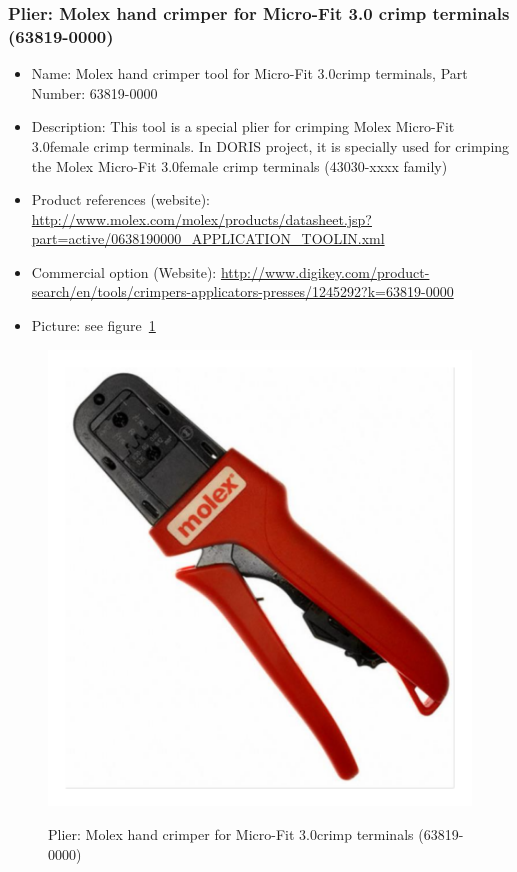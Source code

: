 \subsubsection{Plier: Molex hand crimper for Micro-Fit 3.0 \texttrademark crimp terminals (63819-0000)} \label{DEVICE:TOOLCRIMPERmicro}
\begin{itemize}
\item Name: Molex hand crimper tool for Micro-Fit 3.0\texttrademark crimp terminals, Part Number: 63819-0000
  \item Description: This tool is a special plier for crimping Molex Micro-Fit 3.0\texttrademark female crimp terminals. In DORIS project, it is specially used for crimping the Molex Micro-Fit 3.0\texttrademark female crimp terminals (43030-xxxx family)
  \item Product references (website): \href{http://www.molex.com/molex/products/datasheet.jsp?part=active/0638190000\_APPLICATION\_TOOLIN.xml}{http://www.molex.com/molex/products/datasheet.jsp?part=active/0638190000\_APPLICATION\_TOOLIN.xml}
  \item Commercial option (Website): \href{http://www.digikey.com/product-search/en/tools/crimpers-applicators-presses/1245292?k=63819-0000}{http://www.digikey.com/product-search/en/tools/crimpers-applicators-presses/1245292?k=63819-0000}
  \item Picture: see figure~\ref{FIG:DEVICECRIMPERmicro}
\end{itemize}
\begin{figure}
  \centering
  \includegraphics[angle=90,width=1\columnwidth]{figs/body02/FIGDEVICECRIMPERmicro.pdf}\\
  \caption[Plier: Molex hand crimper for Micro-Fit 3.0\texttrademark crimp terminals (63819-0000)]{Plier: Molex hand crimper for Micro-Fit 3.0\texttrademark crimp terminals (63819-0000)}
  \label{FIG:DEVICECRIMPERmicro}
\end{figure}
